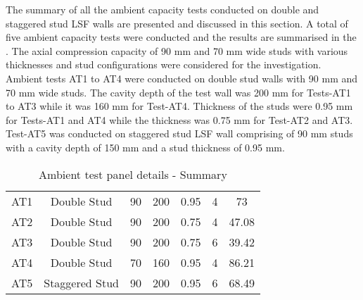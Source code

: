 The summary of all the ambient capacity tests conducted on double and staggered stud LSF walls are presented and discussed in this section. A total of five ambient capacity tests were conducted and the results are summarised in the . The axial compression capacity of 90 mm and 70 mm wide studs with various thicknesses and stud configurations were considered for the investigation. Ambient tests AT1 to AT4 were conducted on double stud walls with 90 mm and 70 mm wide studs. The cavity depth of the test wall was 200 mm for Tests-AT1 to AT3 while it was 160 mm for Test-AT4. Thickness of the studs were 0.95 mm for Tests-AT1 and AT4 while the thickness was 0.75 mm for Test-AT2 and AT3. Test-AT5 was conducted on staggered stud LSF wall comprising of 90 mm studs with a cavity depth of 150 mm and a stud thickness of 0.95 mm.  
\begin{table}[!htbp]
	\centering
	\caption{Ambient test panel details - Summary}
	\begin{tabular}{ccccccc}
		\toprule
		\multicolumn{1}{m{2.4em}}{\centering{Test Name}} & 
		\multicolumn{1}{m{5.6em}}{\centering{Description}} & 
		\multicolumn{1}{m{2.85em}}{\centering{Stud Depth (mm)}} & 
		\multicolumn{1}{m{2.85em}}{\centering{Cavity Depth (mm)}} & 
		\multicolumn{1}{m{5em}}{\centering{Stud Thickness (mm)}} & 
		\multicolumn{1}{m{3em}}{\centering{No of Studs}} &
		\multicolumn{1}{m{3em}}{\centering{Failure Load (kN)}} \\
		\midrule
		AT1  & Double Stud & 90 & 200 & 0.95 & 4 & 73 \\
		AT2  & Double Stud & 90 & 200 & 0.75 & 4 & 47.08 \\
		AT3  & Double Stud & 90 & 200 & 0.75 & 6 & 39.42 \\
		AT4  & Double Stud & 70 & 160 & 0.95 & 4 & 86.21 \\
		AT5  & Staggered Stud & 90 & 200 & 0.95 & 6 & 68.49 \\
		\bottomrule
	\end{tabular}%
	\label{tab:ambient-test-results}%
\end{table}%

